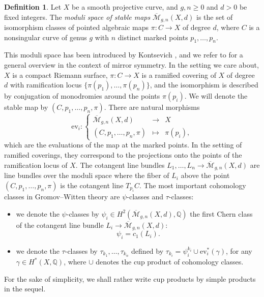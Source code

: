 \documentclass[11pt,a4paper,reqno]{article}
\theoremstyle{definition}
\newtheorem{definition}[theorem]{Definition}
\theoremstyle{remark}
\newcommand\Q{{\mathbb Q}}
\newcommand\ev{{\mathrm{ev}}}
\begin{document}
\begin{definition}
Let $X$ be a smooth projective curve, and $g,n\geq 0$ and $d>0$ be fixed integers. The \emph{moduli space of stable maps} $\overline{\mathcal{M}}_{g,n}(X,d)$ is the set of isomorphism classes of pointed algebraic maps $\pi:C\to X$ of degree $d$, where $C$ is a nonsingular curve of genus $g$ with $n$ distinct marked points $p_1,\ldots,p_n$.
\end{definition}

This moduli space has been introduced by Kontsevich \cite{Kon95}, and we refer to \cite{HKKPRV} for a general overview in the context of mirror symmetry. In the setting we care about, $X$ is a compact Riemann surface, $\pi:C\to X$ is a ramified covering of $X$ of degree $d$ with ramification locus $\{\pi(p_1),\ldots,\pi(p_n)\}$, and the isomorphism is described by conjugation of monodromies around the points $\pi(p_i)$. We will denote the stable map by $(C,p_1,\ldots,p_n,\pi)$. There are natural morphisms
\[
\ev_i:\left\lbrace\begin{array}{ccc}
\overline{\mathcal{M}}_{g,n}(X,d) & \longrightarrow & X\\
(C,p_1,\ldots,p_n,\pi) & \longmapsto & \pi(p_i),
\end{array}\right.
\]
which are the evaluations of the map at the marked points. In the setting of ramified coverings, they correspond to the projections onto the points of the ramification locus of $X$. The cotangent line bundles $L_1,\ldots,L_n\to\overline{\mathcal{M}}_{g,n}(X,d)$ are line bundles over the moduli space where the fiber of $L_i$ above the point $(C,p_1,\ldots,p_n,\pi)$ is the cotangent line $T_{p_i}C$. The most important cohomology classes in Gromov--Witten theory are $\psi$-classes and $\tau$-classes:
\begin{itemize}
\item we denote the $\psi$-classes by $\psi_i\in H^2(\overline{\mathcal{M}}_{g,n}(X,d),\Q)$ the first Chern class of the cotangent line bundle $L_i\to\overline{\mathcal{M}}_{g,n}(X,d)$:
\[
\psi_i = c_1(L_i).
\]
\item we denote the $\tau$-classes by $\tau_{k_1},\ldots,\tau_{k_n}$ defined by  $\tau_{k_i}=\psi_i^{k_i}\cup\ev_i^*(\gamma)$, for any $\gamma\in H^*(X,\Q)$, where $\cup$ denotes the cup product of cohomology classes. 
\end{itemize}
For the sake of simplicity, we shall rather write cup products by simple products in the sequel.
\end{document}
